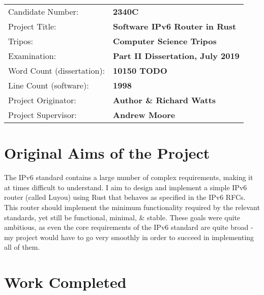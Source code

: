 \documentclass[12pt,a4paper,twoside,openright]{report}
\begin{document}
{\large
\begin{tabular}{ll}
Candidate Number:          & \bf 2340C                      \\
Project Title:             & \bf Software IPv6 Router in Rust \\
Tripos:                    & \bf Computer Science Tripos  \\
Examination:               & \bf Part II Dissertation, July 2019  \\
Word Count (dissertation): & \bf 10150 TODO\footnotemark[1]  \\
Line Count (software):     & \bf 1998 \footnotemark[2] \\
Project Originator:        & \bf Author \& Richard Watts \\
Project Supervisor:        & \bf Andrew Moore \\
\end{tabular}
}






\section*{Original Aims of the Project}

The IPv6 standard\cite{ipv6_rfc} contains a large number of complex requirements, making it at times difficult to understand. I aim to design and implement a simple IPv6 router (called Luyou) using Rust\cite{rust} that behaves as specified in the IPv6 RFCs. This router should implement the minimum functionality required by the relevant standards, yet still be functional, minimal, \& stable.  These goals were quite ambitious, as even the core requirements of the IPv6 standard are quite broad - my project would have to go very smoothly in order to succeed in implementing all of them.

\section*{Work Completed}
\end{document}
